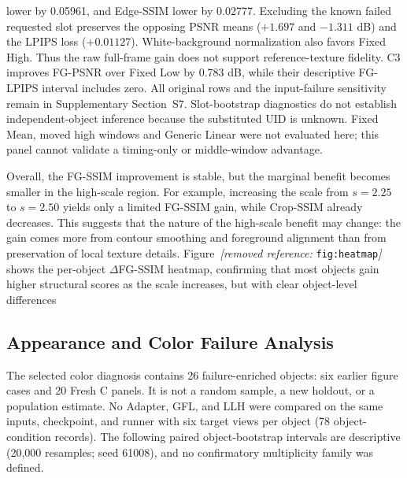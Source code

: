 \documentclass[times,twocolumn,final]{elsarticle}
\providecommand{\DIFadd}[1]{{\protect\color{blue} \sf #1}} %
\providecommand{\DIFdel}[1]{{\protect\color{red} \scriptsize #1}} %
\providecommand{\DIFaddbegin}{} %
\providecommand{\DIFaddend}{} %
\providecommand{\DIFdelbegin}{} %
\providecommand{\DIFdelend}{} %
\begin{document}
\DIFdelend \DIFaddbegin \DIFadd{lower by 0.05961, and Edge-SSIM lower by 0.02777. Excluding the known failed requested slot preserves the opposing PSNR means ($+1.697$ and $-1.311$ dB) and the LPIPS loss ($+0.01127$). White-background normalization also favors Fixed High. Thus the raw full-frame gain does not support reference-texture fidelity. C3 improves FG-PSNR over Fixed Low by 0.783 dB, while their descriptive FG-LPIPS interval includes zero. All original rows and the input-failure sensitivity remain in Supplementary Section~S7. Slot-bootstrap diagnostics do not establish independent-object inference because the substituted UID is unknown. Fixed Mean, moved high windows and Generic Linear were not evaluated here; this panel cannot validate a timing-only or middle-window advantage.
}\DIFaddend 

\DIFdelbegin \DIFdel{Overall, the FG-SSIM improvement is stable, but the marginal benefit becomes smaller in the high-scale region. For example, increasing the scale from $s = 2.25$ to $s = 2.50$ yields only a limited FG-SSIM gain, while Crop-SSIM already decreases. This suggests that the nature of the high-scale benefit may change: the gain comes more from contour smoothing and foreground alignment than from preservation of local texture details. Figure~\textit{[removed reference: }\texttt{fig:heatmap}\textit{]} shows the per-object $\Delta$FG-SSIM heatmap, confirming that most objects gain higher structural scores as the scale increases, but with clear object-level differences}\DIFdelend \DIFaddbegin \subsection{Appearance and Color Failure Analysis}
\label{subsec:appearance-color}

\DIFadd{The selected color diagnosis contains 26 failure-enriched objects: six earlier figure cases and 20 Fresh C panels. It is not a random sample, a new holdout, or a population estimate. No Adapter, GFL, and LLH were compared on the same inputs, checkpoint, and runner with six target views per object (78 object-condition records). The following paired object-bootstrap intervals are descriptive (20,000 resamples; seed 61008), and no confirmatory multiplicity family was defined}\DIFaddend .
\end{document}
